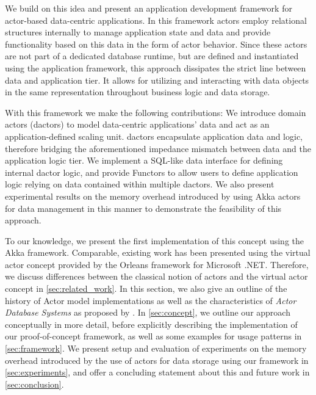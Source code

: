   We build on this idea and present an application development framework for actor-based data-centric applications.
  In this framework actors employ relational structures internally to manage application state and data
  and provide functionality based on this data in the form of actor behavior.
  Since these actors are not part of a dedicated database runtime, but are defined and instantiated using the application framework, this approach dissipates the strict line between data and application tier.
  It allows for utilizing and interacting with data objects in the same representation throughout business logic and data storage.

  With this framework we make the following contributions:
  We introduce domain actors (\glspl{dactor}) to model data-centric applications' data and act as an application-defined scaling unit.
  \Glspl{dactor} encapsulate application data and logic, therefore bridging the aforementioned impedance mismatch between data and the application logic tier.
  We implement a SQL-like data interface for defining internal \gls{dactor} logic, and provide Functors to allow users to define application logic relying on data contained within multiple \glspl{dactor}.
  We also present experimental results on the memory overhead introduced by using Akka actors for data management in this manner to demonstrate the feasibility of this approach.

  To our knowledge, we present the first implementation of this concept using the Akka framework.
  Comparable, existing work has been presented using the virtual actor concept provided by the Orleans framework for Microsoft .NET.
  Therefore, we discuss differences between the classical notion of actors and the virtual actor concept in \cref{sec:related_work}.
  In this section, we also give an outline of the history of Actor model implementations as well as the characteristics of \textit{Actor Database Systems} as proposed by \citeauthor{manifesto}.
  In \cref{sec:concept}, we outline our approach conceptually in more detail,
  before explicitly describing the implementation of our proof-of-concept framework, as well as some examples for usage patterns in \cref{sec:framework}.
  We present setup and evaluation of experiments on the memory overhead introduced by the use of actors for data storage using our framework in \cref{sec:experiments},
  and offer a concluding statement about this and future work in \cref{sec:conclusion}.
  
